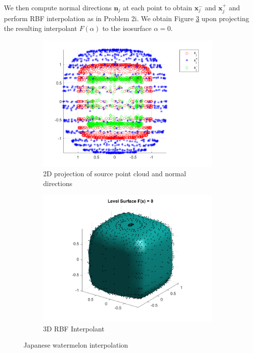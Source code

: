 \begin{solution}
  \pagebreak
  We then compute normal directions $\bm{n}_j$ at each point to obtain $\bm{x}^-_j$ and $\bm{x}^+_j$ and perform RBF
  interpolation as in Problem 2i. We obtain Figure \ref{fig:problem_2ii_rbf_interpolant} upon projecting the resulting 
  interpolant $F(\alpha)$ to the isosurface $\alpha = 0$.

  \begin{figure}[h]
    \centering
    \begin{subfigure}{\textwidth}
        \centering
        \includegraphics*[width=.625\textwidth]{problem_2ii_normal_cloud_2d.png}
        \caption{2D projection of source point cloud and normal directions}
        \label{fig:problem_2ii_normal_cloud_2d}
    \end{subfigure}
    \begin{subfigure}{\textwidth}
        \centering
        \includegraphics*[width=.625\textwidth]{problem_2ii_rbf_surface.png}
        \caption{3D RBF Interpolant}
        \label{fig:problem_2ii_rbf_surface}
    \end{subfigure}
    \caption{Japanese watermelon interpolation}
    \label{fig:problem_2ii_rbf_interpolant}
  \end{figure}
\end{solution}